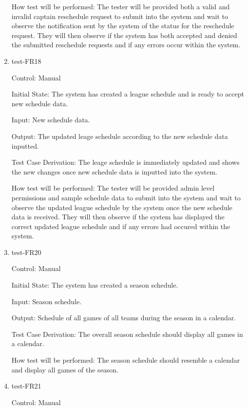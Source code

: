 \documentclass[12pt, titlepage]{article}
\begin{document}
\begin{enumerate}
  How test will be performed: The tester will be provided both a valid and invalid captain
  reschedule request to submit into the system and wait to observe the notification sent
  by the system of the status for the reschedule request. They will then observe if the
  system has both accepted and denied the submitted reschedule requests and if any errors
  occur within the system. 

  \item{test-FR18\\}

  Control: Manual
            
  Initial State: The system has created a league schedule and is ready to
  accept new schedule data.
            
  Input: New schedule data.
            
  Output: The updated leage schedule according to the new schedule data inputted.

  Test Case Derivation: The leage schedule is immediately updated and shows the new changes
  once new schedule data is inputted into the system.
            
  How test will be performed: The tester will be provided admin level permissions and sample
  schedule data to submit into the system and wait to observe the updated league schedule
  by the system once the new schedule data is received. They will then observe if the
  system has displayed the correct updated league schedule and if any errors had
  occured within the system.

  \item{test-FR20\\}

  Control: Manual
            
  Initial State: The system has created a season schedule.
            
  Input: Season schedule.
            
  Output: Schedule of all games of all teams during the season in a calendar. 

  Test Case Derivation: The overall season schedule should display all games in a calendar.
            
  How test will be performed: The season schedule should resemble a calendar and display all games of the season.

  \item{test-FR21\\}

  Control: Manual
            

\end{enumerate}
\end{document}
